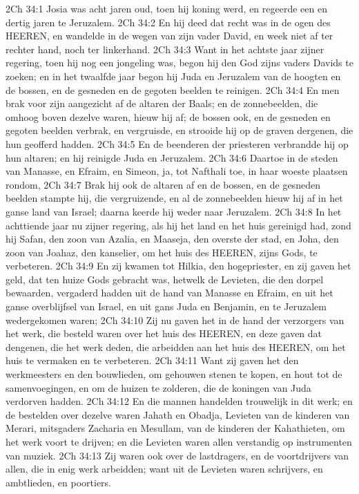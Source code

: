 2Ch 34:1  Josia was acht jaren oud, toen hij koning werd, en regeerde een en dertig jaren te Jeruzalem.
2Ch 34:2  En hij deed dat recht was in de ogen des HEEREN, en wandelde in de wegen van zijn vader David, en week niet af ter rechter hand, noch ter linkerhand.
2Ch 34:3  Want in het achtste jaar zijner regering, toen hij nog een jongeling was, begon hij den God zijns vaders Davids te zoeken; en in het twaalfde jaar begon hij Juda en Jeruzalem van de hoogten en de bossen, en de gesneden en de gegoten beelden te reinigen.
2Ch 34:4  En men brak voor zijn aangezicht af de altaren der Baals; en de zonnebeelden, die omhoog boven dezelve waren, hieuw hij af; de bossen ook, en de gesneden en gegoten beelden verbrak, en vergruisde, en strooide hij op de graven dergenen, die hun geofferd hadden.
2Ch 34:5  En de beenderen der priesteren verbrandde hij op hun altaren; en hij reinigde Juda en Jeruzalem.
2Ch 34:6  Daartoe in de steden van Manasse, en Efraim, en Simeon, ja, tot Nafthali toe, in haar woeste plaatsen rondom,
2Ch 34:7  Brak hij ook de altaren af en de bossen, en de gesneden beelden stampte hij, die vergruizende, en al de zonnebeelden hieuw hij af in het ganse land van Israel; daarna keerde hij weder naar Jeruzalem.
2Ch 34:8  In het achttiende jaar nu zijner regering, als hij het land en het huis gereinigd had, zond hij Safan, den zoon van Azalia, en Maaseja, den overste der stad, en Joha, den zoon van Joahaz, den kanselier, om het huis des HEEREN, zijns Gods, te verbeteren.
2Ch 34:9  En zij kwamen tot Hilkia, den hogepriester, en zij gaven het geld, dat ten huize Gods gebracht was, hetwelk de Levieten, die den dorpel bewaarden, vergaderd hadden uit de hand van Manasse en Efraim, en uit het ganse overblijfsel van Israel, en uit gans Juda en Benjamin, en te Jeruzalem wedergekomen waren;
2Ch 34:10  Zij nu gaven het in de hand der verzorgers van het werk, die besteld waren over het huis des HEEREN, en deze gaven dat dengenen, die het werk deden, die arbeidden aan het huis des HEEREN, om het huis te vermaken en te verbeteren.
2Ch 34:11  Want zij gaven het den werkmeesters en den bouwlieden, om gehouwen stenen te kopen, en hout tot de samenvoegingen, en om de huizen te zolderen, die de koningen van Juda verdorven hadden.
2Ch 34:12  En die mannen handelden trouwelijk in dit werk; en de bestelden over dezelve waren Jahath en Obadja, Levieten van de kinderen van Merari, mitsgaders Zacharia en Mesullam, van de kinderen der Kahathieten, om het werk voort te drijven; en die Levieten waren allen verstandig op instrumenten van muziek.
2Ch 34:13  Zij waren ook over de lastdragers, en de voortdrijvers van allen, die in enig werk arbeidden; want uit de Levieten waren schrijvers, en ambtlieden, en poortiers.
